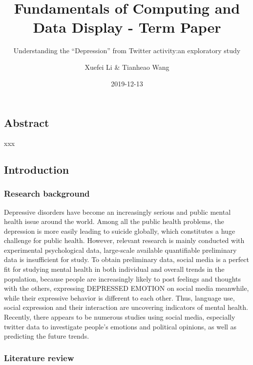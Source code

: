 \documentclass[]{article}
\title{Fundamentals of Computing and Data Display - Term Paper}
\subtitle{Understanding the ``Depression'' from Twitter activity:an exploratory
study}
\author{Xuefei Li \& Tianheao Wang}
\date{2019-12-13}
\begin{document}
\maketitle

{
\setcounter{tocdepth}{2}
\tableofcontents
}
\hypertarget{abstract}{%
\subsection{Abstract}\label{abstract}}

xxx

\hypertarget{introduction}{%
\subsection{Introduction}\label{introduction}}

\hypertarget{research-background}{%
\subsubsection{Research background}\label{research-background}}

Depressive disorders have become an increasingly serious and public
mental health issue around the world. Among all the public health
problems, the depression is more easily leading to suicide globally,
which constitutes a huge challenge for public health. However, relevant
research is mainly conducted with experimental psychological data,
large-scale available quantifiable preliminary data is insufficient for
study. To obtain preliminary data, social media is a perfect fit for
studying mental health in both individual and overall trends in the
population, because people are increasingly likely to post feelings and
thoughts with the others, expressing DEPRESSED EMOTION on social media
meanwhile, while their expressive behavior is different to each other.
Thus, language use, social expression and their interaction are
uncovering indicators of mental health. Recently, there appears to be
numerous studies using social media, especially twitter data to
investigate people's emotions and political opinions, as well as
predicting the future trends.

\hypertarget{literature-review}{%
\subsubsection{Literature review}\label{literature-review}}
\end{document}
